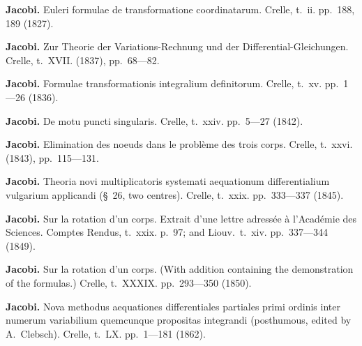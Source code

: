 \documentclass[11pt,a4paper]{book}
\begin{document}
\vspace{0.5em}

\noindent\textbf{Jacobi.} Euleri formulae de transformatione coordinatarum. Crelle, t.~ii. pp.~188, 189 (1827).

\vspace{0.5em}

\noindent\textbf{Jacobi.} Zur Theorie der Variations-Rechnung und der Differential-Gleichungen. Crelle, t.~XVII. (1837), pp.~68---82.

\vspace{0.5em}

\noindent\textbf{Jacobi.} Formulae transformationis integralium definitorum. Crelle, t.~xv. pp.~1---26 (1836).

\vspace{0.5em}

\noindent\textbf{Jacobi.} De motu puncti singularis. Crelle, t.~xxiv. pp.~5---27 (1842).

\vspace{0.5em}

\noindent\textbf{Jacobi.} Elimination des noeuds dans le probl\`{e}me des trois corps. Crelle, t.~xxvi. (1843), pp.~115---131.

\vspace{0.5em}

\noindent\textbf{Jacobi.} Theoria novi multiplicatoris systemati aequationum differentialium vulgarium applicandi (\S~26, two centres). Crelle, t.~xxix. pp.~333---337 (1845).

\vspace{0.5em}

\noindent\textbf{Jacobi.} Sur la rotation d'un corps. Extrait d'une lettre adress\'{e}e \`{a} l'Acad\'{e}mie des Sciences. Comptes Rendus, t.~xxix. p.~97; and Liouv.~t.~xiv. pp.~337---344 (1849).

\vspace{0.5em}

\noindent\textbf{Jacobi.} Sur la rotation d'un corps. (With addition containing the demonstration of the formulas.) Crelle, t.~XXXIX. pp.~293---350 (1850).

\vspace{0.5em}

\noindent\textbf{Jacobi.} Nova methodus aequationes differentiales partiales primi ordinis inter numerum variabilium quemcunque propositas integrandi (posthumous, edited by A.~Clebsch). Crelle, t.~LX. pp.~1---181 (1862).

\vspace{0.5em}
\end{document}
